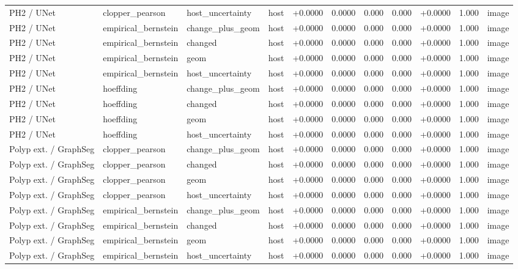 \begin{table}[t]
\begin{tabular}{lllllllllll}
PH2 / UNet & clopper\_pearson & host\_uncertainty & host & +0.0000 & 0.0000 & 0.000 & 0.000 & +0.0000 & 1.000 & image \\
PH2 / UNet & empirical\_bernstein & change\_plus\_geom & host & +0.0000 & 0.0000 & 0.000 & 0.000 & +0.0000 & 1.000 & image \\
PH2 / UNet & empirical\_bernstein & changed & host & +0.0000 & 0.0000 & 0.000 & 0.000 & +0.0000 & 1.000 & image \\
PH2 / UNet & empirical\_bernstein & geom & host & +0.0000 & 0.0000 & 0.000 & 0.000 & +0.0000 & 1.000 & image \\
PH2 / UNet & empirical\_bernstein & host\_uncertainty & host & +0.0000 & 0.0000 & 0.000 & 0.000 & +0.0000 & 1.000 & image \\
PH2 / UNet & hoeffding & change\_plus\_geom & host & +0.0000 & 0.0000 & 0.000 & 0.000 & +0.0000 & 1.000 & image \\
PH2 / UNet & hoeffding & changed & host & +0.0000 & 0.0000 & 0.000 & 0.000 & +0.0000 & 1.000 & image \\
PH2 / UNet & hoeffding & geom & host & +0.0000 & 0.0000 & 0.000 & 0.000 & +0.0000 & 1.000 & image \\
PH2 / UNet & hoeffding & host\_uncertainty & host & +0.0000 & 0.0000 & 0.000 & 0.000 & +0.0000 & 1.000 & image \\
Polyp ext. / GraphSeg & clopper\_pearson & change\_plus\_geom & host & +0.0000 & 0.0000 & 0.000 & 0.000 & +0.0000 & 1.000 & image \\
Polyp ext. / GraphSeg & clopper\_pearson & changed & host & +0.0000 & 0.0000 & 0.000 & 0.000 & +0.0000 & 1.000 & image \\
Polyp ext. / GraphSeg & clopper\_pearson & geom & host & +0.0000 & 0.0000 & 0.000 & 0.000 & +0.0000 & 1.000 & image \\
Polyp ext. / GraphSeg & clopper\_pearson & host\_uncertainty & host & +0.0000 & 0.0000 & 0.000 & 0.000 & +0.0000 & 1.000 & image \\
Polyp ext. / GraphSeg & empirical\_bernstein & change\_plus\_geom & host & +0.0000 & 0.0000 & 0.000 & 0.000 & +0.0000 & 1.000 & image \\
Polyp ext. / GraphSeg & empirical\_bernstein & changed & host & +0.0000 & 0.0000 & 0.000 & 0.000 & +0.0000 & 1.000 & image \\
Polyp ext. / GraphSeg & empirical\_bernstein & geom & host & +0.0000 & 0.0000 & 0.000 & 0.000 & +0.0000 & 1.000 & image \\
Polyp ext. / GraphSeg & empirical\_bernstein & host\_uncertainty & host & +0.0000 & 0.0000 & 0.000 & 0.000 & +0.0000 & 1.000 & image \\

\end{tabular}
\end{table}
